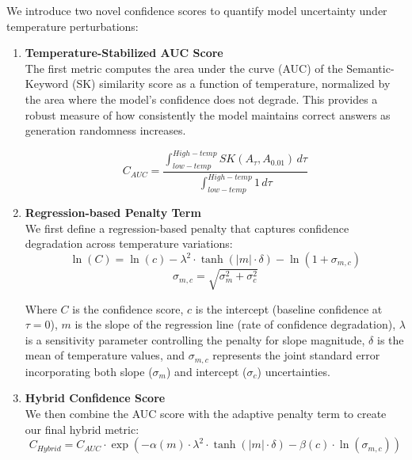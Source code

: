 \documentclass[sigconf]{acmart}
\begin{document}
We introduce two novel confidence scores to quantify model uncertainty under temperature perturbations:
\begin{enumerate}
    \item \textbf{Temperature-Stabilized AUC Score}\\
    The first metric computes the area under the curve (AUC) of the Semantic-Keyword (SK) similarity score as a function of temperature, normalized by the area where the model's confidence does not degrade. This provides a robust measure of how consistently the model maintains correct answers as generation randomness increases.

    \begin{equation}
        C_{AUC} = \frac{\int_{low-temp}^{High-temp} SK(A_\tau, A_{0.01}) \, d\tau}{\int_{low-temp}^{High-temp} 1 \, d\tau}
    \end{equation}
    
    \item \textbf{Regression-based Penalty Term}\\
    We first define a regression-based penalty that captures confidence degradation across temperature variations:
    \begin{equation}
        \ln(C) = \ln(c) - \lambda^2 \cdot \tanh(|m| \cdot \delta) - \ln(1 + \sigma_{m,c})
    \end{equation}
    \begin{equation}
        \sigma_{m,c} = \sqrt{\sigma^2_m + \sigma^2_c}
    \end{equation}
    
    Where $C$ is the confidence score, $c$ is the intercept (baseline confidence at $\tau=0$), $m$ is the slope of the regression line (rate of confidence degradation), $\lambda$ is a sensitivity parameter controlling the penalty for slope magnitude, $\delta$ is the mean of temperature values, and $\sigma_{m,c}$ represents the joint standard error incorporating both slope ($\sigma_m$) and intercept ($\sigma_c$) uncertainties.
    
    \item \textbf{Hybrid Confidence Score}\\
    We then combine the AUC score with the adaptive penalty term to create our final hybrid metric:
    \begin{equation}
        C_{Hybrid} = C_{AUC} \cdot \exp\left(-\alpha(m) \cdot \lambda^2 \cdot \tanh(|m| \cdot \delta) - \beta(c) \cdot \ln(\sigma_{m,c})\right)
    \end{equation}
    

\end{enumerate}
\end{document}
